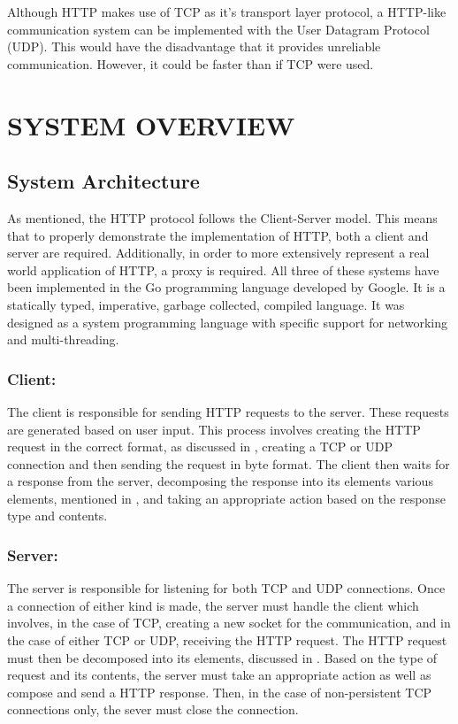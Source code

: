 \documentclass[10pt,twocolumn]{witseiepaper}
\begin{document}
	Although HTTP makes use of TCP as it's transport layer protocol, a HTTP-like communication system can be implemented with the User Datagram Protocol (UDP). This would have the disadvantage that it provides unreliable communication. However, it could be faster than if TCP were used.


\section{SYSTEM OVERVIEW} \label{sysover}

	\subsection{System Architecture}

	As mentioned, the HTTP protocol follows the Client-Server model. This means that to properly demonstrate the implementation of HTTP, both a client and server are required. Additionally, in order to more extensively represent a real world application of HTTP, a proxy is required. All three of these systems have been implemented in the Go programming language developed by Google. It is a statically typed, imperative, garbage collected, compiled language. It was designed as a system programming language with specific support for networking and multi-threading.

	\subsubsection{Client:}

	The client is responsible for sending HTTP requests to the server. These requests are generated based on user input. This process involves creating the HTTP request in the correct format, as discussed in , creating a TCP or UDP connection and then sending the request in byte format. The client then waits for a response from the server, decomposing the response into its elements various elements, mentioned in , and taking an appropriate action based on the response type and contents.

	\subsubsection{Server:}

	The server is responsible for listening for both TCP and UDP connections. Once a connection of either kind is made, the server must handle the client which involves, in the case of TCP, creating a new socket for the communication, and in the case of either TCP or UDP, receiving the HTTP request. The HTTP request must then be decomposed into its elements, discussed in . Based on the type of request and its contents, the server must take an appropriate action as well as compose and send a HTTP response. Then, in the case of non-persistent TCP connections only, the sever must close the connection.
\end{document}
